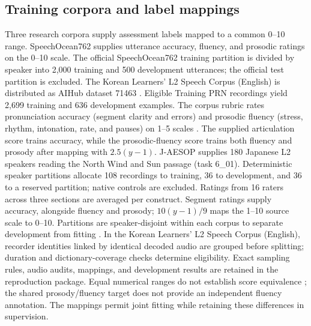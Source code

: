 \documentclass[10pt]{article}
\begin{document}
\subsection{Training corpora and label mappings}
Three research corpora supply assessment labels mapped to a common 0--10 range. SpeechOcean762 supplies utterance accuracy, fluency, and prosodic ratings on the 0--10 scale. The official SpeechOcean762 training partition is divided by speaker into 2,000 training and 500 development utterances; the official test partition is excluded. The Korean Learners' L2 Speech Corpus (English) \cite{han} is distributed as AIHub dataset 71463 \cite{aihub}. Eligible Training PRN recordings yield 2,699 training and 636 development examples. The corpus rubric rates pronunciation accuracy (segment clarity and errors) and prosodic fluency (stress, rhythm, intonation, rate, and pauses) on 1--5 scales \cite{han}. The supplied articulation score trains accuracy, while the prosodic-fluency score trains both fluency and prosody after mapping with $2.5(y-1)$. J-AESOP \cite{aesop} supplies 180 Japanese L2 speakers reading the North Wind and Sun passage (task 6\_01). Deterministic speaker partitions allocate 108 recordings to training, 36 to development, and 36 to a reserved partition; native controls are excluded. Ratings from 16 raters across three sections are averaged per construct. Segment ratings supply accuracy, alongside fluency and prosody; $10(y-1)/9$ maps the 1--10 source scale to 0--10. Partitions are speaker-disjoint within each corpus to separate development from fitting \cite{cawley}. In the Korean Learners' L2 Speech Corpus (English), recorder identities linked by identical decoded audio are grouped before splitting; duration and dictionary-coverage checks determine eligibility. Exact sampling rules, audio audits, mappings, and development results are retained in the reproduction package. Equal numerical ranges do not establish score equivalence \cite{dorans}; the shared prosody/fluency target does not provide an independent fluency annotation. The mappings permit joint fitting while retaining these differences in supervision.
\end{document}
